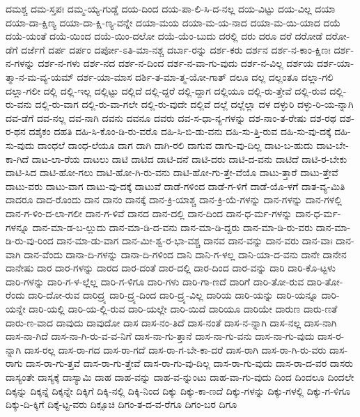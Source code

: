 {ದಮಶ್ಚ
ದಮ-ಸ್ತಪಃ
ದಮ್ಮ-ಯ್ಯ-ಗುಡ್ಡೆ
ದಯ-ದಿಂದ
ದಯ-ಪಾ-ಲಿ-ಸಿ-ದ-ನಲ್ಲ
ದಯ-ವಿಟ್ಟು
ದಯ-ವಿಲ್ಲ
ದಯಾ
ದಯಾ-ದಾ-ಕ್ಷಿಣ್ಯ
ದಯಾ-ದಾ-ಕ್ಷಿ-ಣ್ಯ-ವನ್ನೇ
ದಯಾ-ಮಯ
ದಯಾ-ಮ-ಯ-ನಾದ
ದಯಾ-ಮ-ಯಿ-ಯಾದ
ದಯೆ
ದಯೆ-ಯಂತೆ
ದಯೆ-ಯಿಂದ
ದಯೆ-ಯಿಂ-ದಲೋ
ದಯೆ-ಯೆಂ-ಬುದು
ದರಲ್ಲಿ
ದರು
ದರೂ
ದರೆ
ದರೋಡೆ
ದರೋ-ಡೆಗೆ
ದರ್ಜೆಗೆ
ದರ್ಪ
ದರ್ಪಂ
ದರ್ಪೋ-ಽತಿ-ಮಾ-ನಶ್ಚ
ದರ್ಬಾ-ರನ್ನು
ದರ್ಶ-ಕರು
ದರ್ಶನ
ದರ್ಶ-ನ-ಕಾಂ-ಕ್ಷಿಣಃ
ದರ್ಶ-ನ-ಗಳನ್ನು
ದರ್ಶ-ನ-ಗಳು
ದರ್ಶ-ನದ
ದರ್ಶ-ನ-ದಿಂದ
ದರ್ಶ-ನ-ವಾ-ಗು-ವುದು
ದರ್ಶ-ನ-ವಿಲ್ಲ
ದರ್ಶಯ
ದರ್ಶ-ಯಾ-ತ್ಮಾ-ನ-ಮ-ವ್ಯ-ಯಮ್
ದರ್ಶ-ಯಾ-ಮಾಸ
ದರ್ಶಿ-ತ-ಮಾ-ತ್ಮ-ಯೋ-ಗಾತ್
ದಲೂ
ದಲ್ಲ
ದಲ್ಲಂತೂ
ದಲ್ಲಾ-ಗಲಿ
ದಲ್ಲಾ-ಗಲೀ
ದಲ್ಲಿ
ದಲ್ಲಿ-ಇಲ್ಲ
ದಲ್ಲಿಟ್ಟು
ದಲ್ಲಿದೆ
ದಲ್ಲಿ-ದ್ದರೆ
ದಲ್ಲಿ-ದ್ದಾಗ
ದಲ್ಲಿಯೂ
ದಲ್ಲಿ-ರು-ತ್ತೇವೆ
ದಲ್ಲಿ-ರುವ
ದಲ್ಲಿ-ರು-ವನು
ದಲ್ಲಿ-ರು-ವಾಗ
ದಲ್ಲಿ-ರು-ವಾ-ಗಲೇ
ದಲ್ಲಿ-ರು-ವುದೇ
ದಲ್ಲಿವೆ
ದಲ್ಲೆ
ದಲ್ಲೆಲ್ಲಾ
ದಳ
ದಳ್ಳುರಿ
ದಳ್ಳು-ರಿ-ಯ-ನ್ನಾಗಿ
ದವ-ಡೆಗೆ
ದವ-ನಲ್ಲ
ದವ-ನಾಗಿ
ದವನು
ದವನೂ
ದವರು
ದವ-ಸ-ಧಾ-ನ್ಯ-ಗಳನ್ನು
ದಶ-ನಾಂ-ತ-ರೇಷು
ದಶ-ರಥ
ದಶ-ರ-ಥನ
ದಶೈಕಂ
ದಹತಿ
ದಹಿ-ಸಿ-ಕೊಂ-ಡಿ-ರು-ವರೊ
ದಹಿ-ಸಿ-ಬಿ-ಡು-ವನು
ದಹಿ-ಸು-ತ್ತಿ-ರುವ
ದಹಿ-ಸು-ವು-ದಕ್ಕೆ
ದಹಿ-ಸು-ವುದು
ದಾಂಧಲೆ
ದಾಂಧ-ಲೆಯೂ
ದಾಗ
ದಾಗಿ
ದಾಗಿ-ರಲಿ
ದಾಗುವ
ದಾಗು-ವು-ದಿಲ್ಲ
ದಾಟ-ಬ-ಹುದು
ದಾಟ-ಬೇ-ಕಾ-ಗಿದೆ
ದಾಟ-ಲಾ-ರೆಯ
ದಾಟಲು
ದಾಟಿ
ದಾಟಿದ
ದಾಟಿ-ದನೆ
ದಾಟಿ-ದರು
ದಾಟಿ-ದ-ವನು
ದಾಟಿದೆ
ದಾಟಿ-ರ-ಬೇಕು
ದಾಟಿ-ಸಿದ
ದಾಟಿ-ಹೋ-ಗಲು
ದಾಟಿ-ಹೋ-ಗಿ-ರು-ವನು
ದಾಟಿ-ಹೋ-ಗು-ತ್ತೇ-ವೆಯೊ
ದಾಟು-ತ್ತಾರೆ
ದಾಟು-ತ್ತೇವೆ
ದಾಟು-ವರು
ದಾಟು-ವಾಗ
ದಾಟು-ವು-ದಕ್ಕೆ
ದಾಟುವೆ
ದಾಡೆ-ಗಳಿಂದ
ದಾಡೆ-ಗ-ಳಿಗೆ
ದಾಡೆ-ಯೊ-ಳಗೆ
ದಾತ-ವ್ಯ-ಮಿತಿ
ದಾದರೂ
ದಾದ-ರೊಂದು
ದಾನ
ದಾನಂ
ದಾನಕ್ಕೆ
ದಾನ-ಕ್ರಿ-ಯಾಶ್ಚ
ದಾನ-ಕ್ರಿ-ಯೆ-ಗಳನ್ನು
ದಾನ-ಗಳನ್ನು
ದಾನ-ಗಳಲ್ಲಿ
ದಾನ-ಗ-ಳಿಂ-ದ-ಲಾ-ಗಲೀ
ದಾನ-ಗ-ಳಿವೆ
ದಾನದ
ದಾನ-ದಲ್ಲಿ
ದಾನ-ದಿಂದ
ದಾನ-ಧ-ರ್ಮ-ಗಳನ್ನು
ದಾನ-ಧ-ರ್ಮ-ಗಳನ್ನೂ
ದಾನ-ಮಾ-ಡ-ಬ-ಲ್ಲುದು
ದಾನ-ಮಾ-ಡಿ-ದ-ವನು
ದಾನ-ಮಾ-ಡಿ-ದ್ದರು
ದಾನ-ಮಾ-ಡಿ-ರು-ವರು
ದಾನ-ಮಾ-ಡಿ-ರು-ವು-ರಿಂದ
ದಾನ-ಮಾ-ಡು-ವಾಗ
ದಾನ-ಮೀ-ಶ್ವ-ರ-ಭಾ-ವಶ್ಚ
ದಾನವ
ದಾನ-ವನ್ನು
ದಾನ-ವರು
ದಾನ-ವಾಃ
ದಾನ-ವಾಗಿ
ದಾನ-ವೆಂದು
ದಾನಾ-ದಿ-ಗಳನ್ನು
ದಾನಾ-ದಿ-ಗಳಿಂದ
ದಾನಿ
ದಾನಿ-ಗ-ಳಲ್ಲ
ದಾನಿ-ಯಾ-ದ-ವನು
ದಾನೇ
ದಾನೇನ
ದಾನೇಷು
ದಾರ
ದಾರ-ಗಳನ್ನು
ದಾರದ
ದಾರ-ದಂತೆ
ದಾರ-ದಲ್ಲಿ
ದಾರ-ದಿಂದ
ದಾರ-ವನ್ನು
ದಾರಿ
ದಾರಿ-ಕೊ-ಟ್ಟಳು
ದಾರಿ-ಗಳನ್ನು
ದಾರಿ-ಗ-ಳ-ಲ್ಲೆಲ್ಲ
ದಾರಿ-ಗ-ಳಿಗೂ
ದಾರಿ-ಗಳು
ದಾರಿ-ಗಾ-ಣದೆ
ದಾರಿಗೆ
ದಾರಿ-ತೋ-ರುವ
ದಾರಿ-ತೋ-ರೆಂದು
ದಾರಿ-ದೋ-ರುವ
ದಾರಿದ್ರ್ಯ
ದಾರಿ-ದ್ರ್ಯ-ದಿಂದ
ದಾರಿ-ದ್ರ್ಯ-ವಿಲ್ಲ
ದಾರಿಯ
ದಾರಿ-ಯನ್ನು
ದಾರಿ-ಯನ್ನೂ
ದಾರಿ-ಯನ್ನೇ
ದಾರಿ-ಯಲ್ಲಿ
ದಾರಿ-ಯ-ಲ್ಲಿ-ರುವ
ದಾರಿ-ಯಲ್ಲೇ
ದಾರಿ-ಯಿದೆ
ದಾರಿಯೂ
ದಾರಿಯೇ
ದಾರುಣ
ದಾರು-ಣತೆ
ದಾರು-ಣ-ವಾದ
ದಾವುದು
ದಾವುದೋ
ದಾಸ
ದಾಸ-ನಂ-ತಿದೆ
ದಾಸ-ನಂತೆ
ದಾಸ-ನ-ನ್ನಾಗಿ
ದಾಸ-ನಲ್ಲ
ದಾಸ-ನಾಗಿ
ದಾಸ-ನಾ-ಗಿದೆ
ದಾಸ-ನಾ-ಗಿ-ರು-ವ-ವ-ನಿಗೆ
ದಾಸ-ನಾ-ಗು-ತ್ತಾನೆ
ದಾಸ-ನಾ-ಗು-ವನು
ದಾಸ-ನಾ-ಗು-ವುದು
ದಾಸ-ರ-ನ್ನಾಗಿ
ದಾಸ-ರಲ್ಲ
ದಾಸ-ರಾ-ಗದ
ದಾಸ-ರಾ-ಗದೆ
ದಾಸ-ರಾ-ಗ-ಬೇ-ಕಾ-ದರೆ
ದಾಸ-ರಾಗಿ
ದಾಸ-ರಾ-ಗಿ-ರು-ವರು
ದಾಸ-ರಾಗು
ದಾಸ-ರಾ-ಗು-ತ್ತವೆ
ದಾಸ-ರಾ-ಗು-ತ್ತೇವೆ
ದಾಸ-ರಾ-ಗು-ವು-ದಿಲ್ಲ
ದಾಸ-ರಾ-ಗು-ವುದು
ದಾಸ-ರಾ-ದ-ವರ
ದಾಸರು
ದಾಸ್ಯಂತೇ
ದಾಸ್ಯಕ್ಕೆ
ದಾಸ್ಯಾಮಿ
ದಾಹ
ದಾಹ-ವನ್ನು
ದಾಹ-ವ-ನ್ನುಂಟು
ದಾಹ-ವಾ-ಗು-ವುದು
ದಿಂದ
ದಿಂದಲೂ
ದಿಂದಲೇ
ದಿಕ್ಕನ್ನು
ದಿಕ್ಕನ್ನೆ
ದಿಕ್ಕನ್ನೇ
ದಿಕ್ಕಿಗೆ
ದಿಕ್ಕಿ-ನಲ್ಲಿ
ದಿಕ್ಕಿ-ನಿಂದ
ದಿಕ್ಕು
ದಿಕ್ಕು-ಕಾ-ಣದೆ
ದಿಕ್ಕು-ಗಳನ್ನು
ದಿಕ್ಕು-ಗಳಲ್ಲಿ
ದಿಕ್ಕು-ಗ-ಳಿಗೂ
ದಿಕ್ಕು-ದಿ-ಕ್ಕಿಗೆ
ದಿಕ್ಕೆ-ಟ್ಟ-ವರು
ದಿಕ್ಸೂಚಿ
ದಿಗಂ-ತ-ದ-ವ-ರೆಗೂ
ದಿಗಂ-ಬರ
ದಿಗೂ
}

